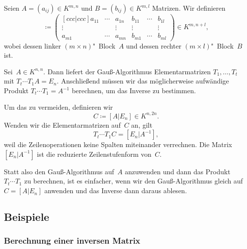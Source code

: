 \documentclass[a4paper]{article}
\begin{document}
\begin{notation}
    Seien $A = (a_{ij}) \in K^{m,n}$ und $B = (b_{ij}) \in K^{m,l}$ Matrizen. Wir definieren
    \begin{equation*}
        [A|B] \coloneqq \begin{pmatrix}[ccc|ccc]
            a_{11} & \cdots & a_{1n} & b_{11} & \cdots & b_{1l} \\
            \vdots &        & \vdots & \vdots &        & \vdots \\
            a_{m1} & \cdots & a_{mn} & b_{m1} & \cdots & b_{ml}
        \end{pmatrix} \in K^{m,n+l},
    \end{equation*}
    wobei dessen linker $(m\times n)$"~Block~$A$ und dessen rechter $(m\times l)$"~Block~$B$ ist.
\end{notation}

\begin{remark}\label{rem:matrix:inverse:trick}
    Sei~$A \in K^{n,n}$. Dann liefert der Gauß-Algorithmus Elementarmatrizen $T_1,\dots,T_t$ mit $T_t\cdots T_1A = E_n$. Anschließend müssen wir das möglicherweise aufwändige Produkt $T_t\cdots T_1 = A^{-1}$ berechnen, um das Inverse zu bestimmen.

    Um das zu vermeiden, definieren wir
    \begin{equation*}
        C \coloneqq [A|E_n] \in K^{n, 2n}.
    \end{equation*}
    Wenden wir die Elementarmatrizen auf~$C$ an, gilt
    \begin{equation*}
        T_t\cdots T_1C = [E_n|A^{-1}],
    \end{equation*}
    weil die Zeilenoperationen keine Spalten miteinander verrechnen. Die Matrix $[E_n|A^{-1}]$ ist die reduzierte Zeilenstufenform von~$C$.

    Statt also den Gauß-Algorithmus auf~$A$ anzuwenden und dann das Produkt $T_t\cdots T_1$ zu berechnen, ist es einfacher, wenn wir den Gauß-Algorithmus gleich auf $C = [A|E_n]$ anwenden und das Inverse dann daraus ablesen.
\end{remark}

\subsection{Beispiele}

\subsubsection{Berechnung einer inversen Matrix}
\end{document}
